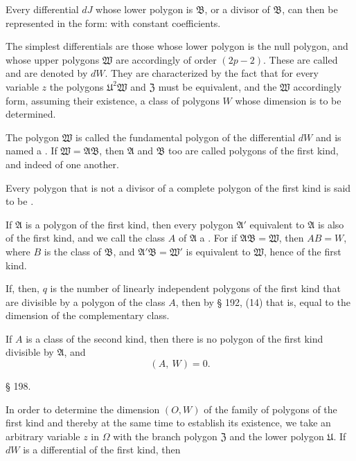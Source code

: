 
Every differential $dJ$ whose lower polygon is $\mathfrak{B}$, or a divisor
of $\mathfrak{B}$, can then be represented in the form:
with constant coefficients.

The simplest differentials are those whose lower polygon is the
null polygon, and whose upper polygons $\mathfrak{W}$ are accordingly of order
$(2p - 2)$. These are called 
and are denoted by $dW$. They are characterized by the fact
that for every variable $z$ the polygons $\mathfrak{U}^2\mathfrak{W}$ and $\mathfrak{Z}$ must be
equivalent, and the $\mathfrak{W}$ accordingly form, assuming their existence, a
class of polygons $W$ whose dimension is to be determined.

The polygon $\mathfrak{W}$ is called the fundamental polygon of the differential $dW$
and is named a . If
$\mathfrak{W} = \mathfrak{A}\mathfrak{B}$, then $\mathfrak{A}$ and $\mathfrak{B}$ too are called polygons of the first
kind, and indeed  of one another.

Every polygon that is not a divisor of a complete polygon
of the first kind is said to be .

If $\mathfrak{A}$ is a polygon of the first kind, then every polygon $\mathfrak{A}'$
equivalent to $\mathfrak{A}$ is also of the first kind, and we call
the class $A$ of $\mathfrak{A}$ a . For if
$\mathfrak{A}\mathfrak{B} = \mathfrak{W}$, then $AB = W$, where $B$ is the class of $\mathfrak{B}$, and
$\mathfrak{A}'\mathfrak{B} = \mathfrak{W}'$ is equivalent to $\mathfrak{W}$, hence of the first kind.

If, then, $q$ is the number of linearly independent polygons
of the first kind that are divisible by a polygon of the class $A$,
then by § 192, (14)
that is, equal to the dimension of the complementary class.

If $A$ is a class of the second kind, then there is no polygon
of the first kind divisible by $\mathfrak{A}$, and
\[ (A,\ W) = 0. \]

\begin{center}
§ 198. \textbf{}
\end{center}

In order to determine the dimension $(O, W)$ of the family of polygons of the first kind and
thereby at the same time to establish its existence, we take
an arbitrary variable $z$ in $\Omega$ with the branch polygon
$\mathfrak{Z}$ and the lower polygon $\mathfrak{U}$. If $dW$ is a differential of the first kind,
then
